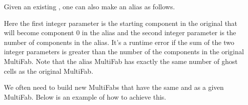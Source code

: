 \documentclass[letterpaper,10pt,english]{sphinxmanual}
\begin{document}
\begin{sphinxVerbatim}[commandchars=\\\{\}]
 
   
   
   
\end{sphinxVerbatim}

\sphinxAtStartPar
Given an existing , one can also make an alias 
as follows.

\begin{sphinxVerbatim}[commandchars=\\\{\}]
   
   
    
\end{sphinxVerbatim}

\sphinxAtStartPar
Here the first integer parameter is the starting component in the original
 that will become component 0 in the alias  and
the second integer parameter is the number of components in the alias. It’s a
runtime error if the sum of the two integer parameters is greater than the
number of the components in the original MultiFab. Note that the alias MultiFab
has exactly the same number of ghost cells as the original MultiFab.

\sphinxAtStartPar
We often need to build new MultiFabs that have the same  and
 as a given MultiFab.  Below is an example of how to
achieve this.
\end{document}
